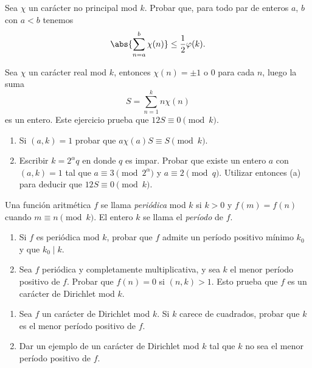 \documentclass[12pt,a4paper]{book}
\begin{document}
    \begin{ejercicio}
        Sea $\chi$ un carácter no principal mod $k$. Probar que, para todo par de enteros
        $a$, $b$ con $a<b$ tenemos
        \begin{equation*}
            \abs{\sum_{n=a}^{b}\chi(n)}\leq\frac{1}{2}\varphi(k).
        \end{equation*}
    \end{ejercicio}

    \begin{ejercicio}
        Sea $\chi$ un carácter real mod $k$, entonces $\chi(n)=\pm1$ o $0$ para cada $n$,
        luego la suma
        \begin{equation*}
            S=\sum_{n=1}^{k}n\chi(n)
        \end{equation*}
        es un entero. Este ejercicio prueba que $12S\equiv0\pmod{k}$.
        \begin{enumerate}
            \item[(a)] Si $(a,k)=1$ probar que $a\chi(a)S\equiv S\pmod{k}$.
            \item[(b)] Escribir $k=2^{\alpha}q$ en donde $q$ es impar. Probar que existe un
            entero $a$ con $(a,k)=1$ tal que $a\equiv3\pmod{2^{\alpha}}$ y
            $a\equiv2\pmod{q}$. Utilizar entonces (a) para deducir que
            $12S\equiv0\pmod{k}$.
        \end{enumerate}
    \end{ejercicio}

    \begin{ejercicio}
        Una función aritmética $f$ se llama \textit{periódica} mod $k$ si $k>0$ y
        $f(m)=f(n)$ cuando $m\equiv n\pmod{k}$. El entero $k$ se llama el \textit{período}
        de $f$.
        \begin{enumerate}
            \item[(a)] Si $f$ es periódica mod $k$, probar que $f$ admite un período
            positivo mínimo $k_{0}$ y que $k_{0}\mid k$.
            \item[(b)] Sea $f$ periódica y completamente multiplicativa, y sea $k$ el menor
            período positivo de $f$. Probar que $f(n)=0$ si $(n,k)>1$. Esto prueba que $f$
            es un carácter de Dirichlet mod $k$.
        \end{enumerate}
    \end{ejercicio}

    \begin{ejercicio}
        \begin{enumerate}
            \item[(a)] Sea $f$ un carácter de Dirichlet mod $k$. Si $k$ carece de
            cuadrados, probar que $k$ es el menor período positivo de $f$.
            \item[(b)] Dar un ejemplo de un carácter de Dirichlet mod $k$ tal que $k$ no sea
            el menor período positivo de $f$.
        \end{enumerate}
    \end{ejercicio}
\end{document}
